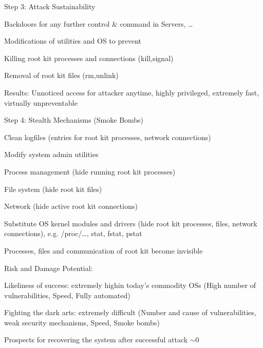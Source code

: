 \documentclass[a4paper]{article}
\begin{document}
\begin{multicols}{3}
\begin{itemize*}
    \end{itemize*}
    Step 3: Attack Sustainability
    \begin{itemize*}
        \item Backdoors for any further control \& command in Servers, \dots
        \item Modifications of utilities and OS to prevent
        \begin{itemize*}
            \item Killing root kit processes and connections (kill,signal)
            \item Removal of root kit files (rm,unlink)
        \end{itemize*}
        \item Results: Unnoticed access for attacker anytime, highly privileged, extremely fast, virtually unpreventable
    \end{itemize*}
    Step 4: Stealth Mechanisms (Smoke Bombs)
    \begin{itemize*}
        \item Clean logfiles (entries for root kit processes, network connections)
        \item Modify system admin utilities
        \begin{itemize*}
            \item Process management (hide running root kit processes)
            \item File system (hide root kit files)
            \item Network (hide active root kit connections)
        \end{itemize*}
        \item Substitute OS kernel modules and drivers (hide root kit processes, files, network connections), e.g. /proc/\dots , stat, fstat, pstat
        \item Processes, files and communication of root kit become invisible
    \end{itemize*}

    Risk and Damage Potential:
    \begin{itemize*}
        \item Likeliness of success: extremely highin today’s commodity OSs (High number of vulnerabilities, Speed, Fully automated)
        \item Fighting the dark arts: extremely difficult (Number and cause of vulnerabilities, weak security mechanisms, Speed, Smoke bombs)
        \item Prospects for recovering the system after successful attack $\sim 0$
    \end{itemize*}


\end{multicols}
\end{document}
